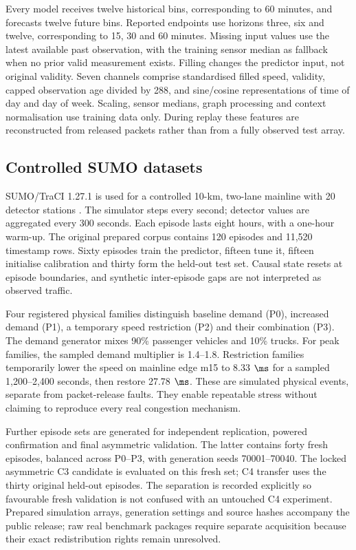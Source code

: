 Every model receives twelve historical bins, corresponding to 60 minutes, and forecasts twelve future bins. Reported endpoints use horizons three, six and twelve, corresponding to 15, 30 and 60 minutes. Missing input values use the latest available past observation, with the training sensor median as fallback when no prior valid measurement exists. Filling changes the predictor input, not original validity. Seven channels comprise standardised filled speed, validity, capped observation age divided by 288, and sine/cosine representations of time of day and day of week. Scaling, sensor medians, graph processing and context normalisation use training data only. During replay these features are reconstructed from released packets rather than from a fully observed test array.

\subsection{Controlled SUMO datasets}
SUMO/TraCI 1.27.1 is used for a controlled 10-km, two-lane mainline with 20 detector stations \citep{lopez2018}. The simulator steps every second; detector values are aggregated every 300 seconds. Each episode lasts eight hours, with a one-hour warm-up. The original prepared corpus contains 120 episodes and 11,520 timestamp rows. Sixty episodes train the predictor, fifteen tune it, fifteen initialise calibration and thirty form the held-out test set. Causal state resets at episode boundaries, and synthetic inter-episode gaps are not interpreted as observed traffic.

Four registered physical families distinguish baseline demand (P0), increased demand (P1), a temporary speed restriction (P2) and their combination (P3). The demand generator mixes 90\% passenger vehicles and 10\% trucks. For peak families, the sampled demand multiplier is 1.4--1.8. Restriction families temporarily lower the speed on mainline edge m15 to 8.33 $\ms$ for a sampled 1,200--2,400 seconds, then restore 27.78 $\ms$. These are simulated physical events, separate from packet-release faults. They enable repeatable stress without claiming to reproduce every real congestion mechanism.

Further episode sets are generated for independent replication, powered confirmation and final asymmetric validation. The latter contains forty fresh episodes, balanced across P0--P3, with generation seeds 70001--70040. The locked asymmetric C3 candidate is evaluated on this fresh set; C4 transfer uses the thirty original held-out episodes. The separation is recorded explicitly so favourable fresh validation is not confused with an untouched C4 experiment. Prepared simulation arrays, generation settings and source hashes accompany the public release; raw real benchmark packages require separate acquisition because their exact redistribution rights remain unresolved.

